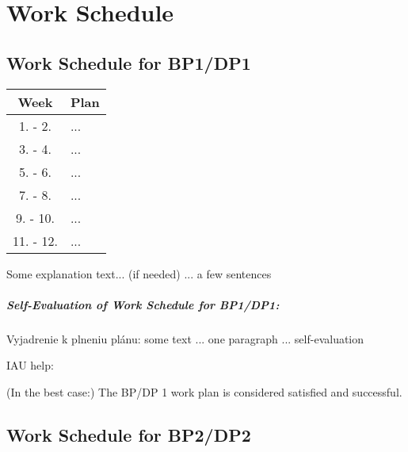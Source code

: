 \thispagestyle{empty}

\chapter{Work Schedule}
\label{chapter:Work-Schedule}


\renewcommand*{\thepage}{B-\arabic{page}}



\section{Work Schedule for BP1/DP1}
\label{sec:Work-Schedule-1st-semester}

\begin{table}[ht]
    \centering
    \begin{tabular}{c|l}
    \toprule
        Week & Plan \\
    \midrule
        1. - 2.     & ... \\
        3. - 4.     & ... \\
        5. - 6.     & ... \\
        7. - 8.     & ... \\
        9. - 10.    & ... \\
        11. - 12.   & ... \\
    \bottomrule
    \end{tabular}
    \label{tab:dp1}
\end{table}


Some explanation text... (if needed) ... a few sentences

\paragraph{Self-Evaluation of Work Schedule for BP1/DP1:}
Vyjadrenie k plneniu plánu: some text ... one paragraph ... self-evaluation

IAU help: 

(In the best case:) The BP/DP 1 work plan is considered satisfied and successful.



\newpage
\section{Work Schedule for BP2/DP2}
\label{sec:Work-Schedule-2nd-semester}

